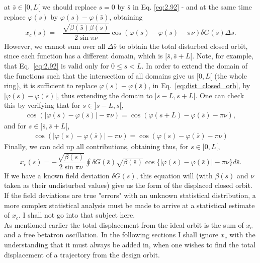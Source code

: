  at $\bar{s} \in [0,L[$ we should replace $s = 0$ by $\bar{s}$ in Eq. \eqref{eq:2.92} - and at the same time replace $\varphi(s)$ by $\varphi(s) - \varphi(\bar{s})$, obtaining
\begin{align}\label{eq:dist_closed_orb}
x_c(s) = -\dfrac{\sqrt{\beta(\bar{s})\beta(s)}}{2\sin\pi\nu} \cos(\varphi(s)-\varphi(\bar{s})-\pi\nu)\delta G(\bar{s})\Delta\bar{s}.
\end{align}
However, we cannot sum over all $\Delta \bar{s}$ to obtain the total disturbed closed orbit, since each function has a different domain, which is $[\bar{s},\bar{s}+L[$. Note, for example, that Eq.~\eqref{eq:2.92} is valid only for $0 \leq s < L$. In order to extend the domain of the functions such that the intersection of all domains give us $[0,L[$ (the whole ring), it is sufficient to replace $\varphi(s) - \varphi(\bar{s})$, in Eq.~\eqref{eq:dist_closed_orb}, by $|\varphi(s) - \varphi(\bar{s})|$, thus extending the domain to $]\bar{s}-L,\bar{s}+L[$. One can check this by verifying that for $s \in ]\bar{s}-L,\bar{s}[$,
\begin{align*}
	\cos(|\varphi(s) - \varphi(\bar{s})| - \pi\nu) = \cos(\varphi(s+L) - \varphi(\bar{s})-\pi\nu),
\end{align*}
and for $s \in [\bar{s},\bar{s}+L[$,
\begin{align*}
\cos(|\varphi(s) - \varphi(\bar{s})| - \pi\nu) = \cos(\varphi(s) - \varphi(\bar{s}) - \pi\nu)
\end{align*}
Finally, we can add up all contributions, obtaining thus, for $s \in [0,L[$,
\begin{align}\label{eq:2.94}
	\boxed{ x_c(s) = -\dfrac{\sqrt{\beta(s)}}{2\sin\pi\nu} \oint \delta G(\bar{s}) \sqrt{\beta(\bar{s})}\cos\{ |\varphi(s) - \varphi(\bar{s})| - \pi\nu \} d\bar{s} }.
\end{align}
If we have a known field deviation $\delta G(s)$, this equation will (with $\beta(s)$ and $\nu$ taken as their undisturbed values) give us the form of the displaced closed orbit.\\
If the field deviations are true "errors" with an unknown statistical distribution, a more complex statistical analysis must be made to arrive at a statistical estimate of $x_c$. I shall not go into that subject here.\\
As mentioned earlier the total displacement from the ideal orbit is the sum of $x_c$ and a free betatron oscillation. In the following sections I shall ignore $x_c$ with the understanding
 that it must always be added in, when one wishes to find the total displacement of a trajectory
 from the design orbit.
